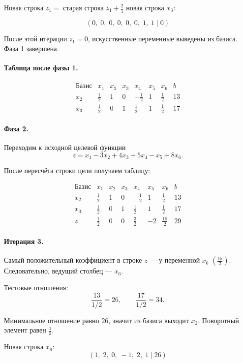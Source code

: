 \documentclass[a4paper,14pt]{extarticle}
\begin{document}
Новая строка \(z_1 =\) старая строка \(z_1 + \frac25\) новая строка \(x_3\):

\[
(0,\;0,\;0,\;0,\;0,\;0,\;1,\;1\mid 0)
\]

После этой итерации \(z_1=0\), искусственные переменные выведены из базиса. Фаза 1 завершена.

\paragraph{Таблица после фазы 1.}

\[
\begin{array}{c|rrrrrr|r}
\text{Базис} & x_1 & x_2 & x_3 & x_4 & x_5 & x_6 & b\\
\hline
x_2 & \frac12 & 1 & 0 & -\frac12 & 1 & \frac12 & 13\\
x_3 & \frac12 & 0 & 1 & \frac12 & 1 & \frac12 & 17
\end{array}
\]

\paragraph{Фаза 2.}
Переходим к исходной целевой функции
\[
z=x_1-3x_2+4x_3+5x_4-x_5+8x_6.
\]

После пересчёта строки цели получаем таблицу:

\[
\begin{array}{c|rrrrrr|r}
\text{Базис} & x_1 & x_2 & x_3 & x_4 & x_5 & x_6 & b\\
\hline
x_2 & \frac12 & 1 & 0 & -\frac12 & 1 & \frac12 & 13\\
x_3 & \frac12 & 0 & 1 & \frac12 & 1 & \frac12 & 17\\
z & \frac12 & 0 & 0 & \frac32 & -2 & \frac{15}{2} & 29
\end{array}
\]

\paragraph{Итерация 3.}
Самый положительный коэффициент в строке \(z\) — у переменной \(x_6\) \(\left(\frac{15}{2}\right)\). Следовательно, ведущий столбец — \(x_6\).

Тестовые отношения:
\[
\frac{13}{1/2}=26,\qquad \frac{17}{1/2}=34.
\]

Минимальное отношение равно \(26\), значит из базиса выходит \(x_2\). Поворотный элемент равен \(\frac12\).

Новая строка \(x_6\):
\[
(1,\;2,\;0,\;-1,\;2,\;1\mid 26)
\]
\end{document}
